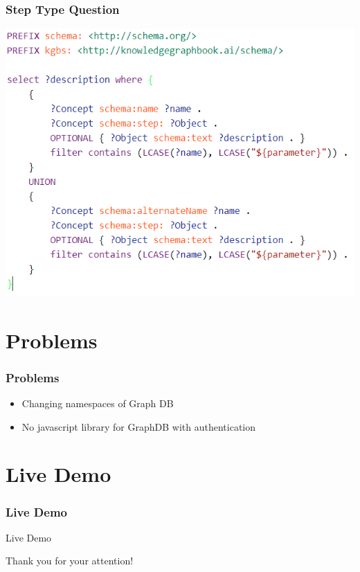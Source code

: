 \documentclass{beamer}
\begin{document}
\begin{frame}
\frametitle{Step Type Question}
\begin{center}
\includegraphics[scale=0.5]{pictures/step_type_query.png}
\end{center}
\end{frame}


\section{Problems}

\begin{frame}
\frametitle{Problems}
\begin{itemize}
\item Changing namespaces of Graph DB
\item No javascript library for GraphDB with authentication
\end{itemize}
\end{frame}



\section{Live Demo}

\begin{frame}
\frametitle{Live Demo}
\begin{center}
{\fontsize{30}{40}\selectfont Live Demo}
\end{center}
\end{frame}


\begin{frame}
\begin{center}
{\fontsize{30}{40}\selectfont Thank you for your attention!}
\end{center}
\end{frame}

\end{document}
